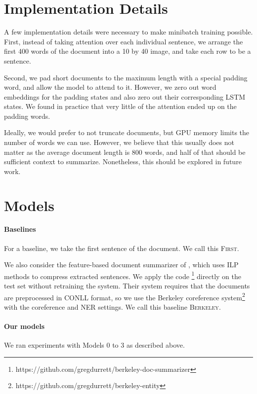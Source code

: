 \documentclass[12pt]{report}
\begin{document}
\section{Implementation Details}

A few implementation details were necessary to make minibatch training possible. First, instead of taking attention over each individual sentence, we arrange the first 400 words of the document into a 10 by 40 image, and take each row to be a sentence.

Second, we pad short documents to the maximum length with a special padding word, and allow the model to attend to it. However, we zero out word embeddings for the padding states and also zero out their corresponding LSTM states. We found in practice that very little of the attention ended up on the padding words.

Ideally, we would prefer to not truncate documents, but GPU memory limits the number of words we can use. However, we believe that this usually does not matter as the average document length is 800 words, and half of that should be sufficient context to summarize. Nonetheless, this should be explored in future work.

\section{Models}

\paragraph{Baselines}
For a baseline, we take the first sentence of the document. We call this \textsc{First}.

We also consider the feature-based document summarizer of \citet{Durrett2016}, which uses ILP methods to compress extracted sentences. We apply the code \footnote{https://github.com/gregdurrett/berkeley-doc-summarizer} directly on the test set without retraining the system. Their system requires that the documents are preprocessed in CONLL format, so we use the Berkeley coreference system\footnote{https://github.com/gregdurrett/berkeley-entity} with the coreference and NER settings. We call this baseline \textsc{Berkeley}.

\paragraph{Our models}

We ran experiments with Models 0 to 3 as described above.
\end{document}
